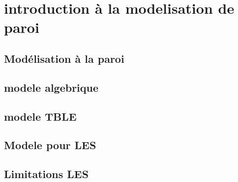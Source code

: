 \section{introduction à la modelisation de paroi}
\subsection{Modélisation à la paroi}
\subsection{modele algebrique}
\subsection{modele TBLE}
\subsection{Modele pour LES}
\subsection{Limitations LES}
